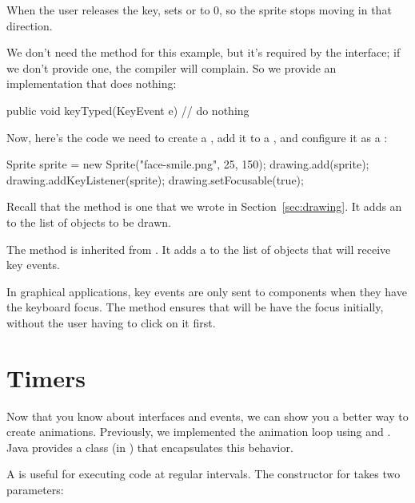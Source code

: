 When the user releases the key,  sets  or  to 0, so the sprite stops moving in that direction.

We don't need the  method for this example, but it's required by the interface; if we don't provide one, the compiler will complain.
So we provide an implementation that does nothing:

\begin{code}
public void keyTyped(KeyEvent e) {
    // do nothing
}
\end{code}

Now, here's the code we need to create a , add it to a , and configure it as a :

\begin{code}
Sprite sprite = new Sprite("face-smile.png", 25, 150);
drawing.add(sprite);
drawing.addKeyListener(sprite);
drawing.setFocusable(true);
\end{code}

Recall that the  method is one that we wrote in Section~\ref{sec:drawing}.
It adds an  to the list of objects to be drawn.

The  method is inherited from .
It adds a  to the list of objects that will receive key events.

In graphical applications, key events are only sent to components when they have the keyboard focus.
The  method ensures that  will be have the focus initially, without the user having to click on it first.


\section{Timers}


Now that you know about interfaces and events, we can show you a better way to create animations.
Previously, we implemented the animation loop using  and .
Java provides a  class (in ) that encapsulates this behavior.

A  is useful for executing code at regular intervals.
The constructor for  takes two parameters:

